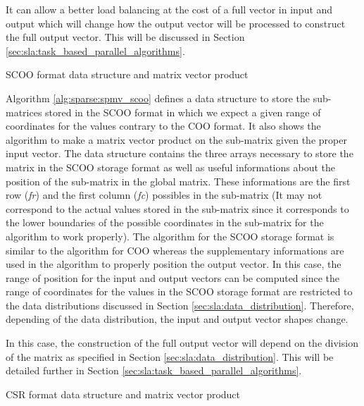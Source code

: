 It can allow a better load balancing at the cost of a full vector in input and output which will change how the output vector will be processed to construct the full output vector.
This will be discussed in Section \ref{sec:sla:task_based_parallel_algorithms}.


\begin{algorithm}[h]
	\DontPrintSemicolon
	\SetAlgoVlined
	\caption{SCOO format data structure and matrix vector product\label{alg:sparse:spmv_scoo}}

	\;
\end{algorithm}

Algorithm \ref{alg:sparse:spmv_scoo} defines a data structure to store the sub-matrices stored in the SCOO format in which we expect a given range of coordinates for the values contrary to the COO format.
It also shows the algorithm to make a matrix vector product on the sub-matrix given the proper input vector.
The data structure contains the three arrays necessary to store the matrix in the SCOO storage format as well as useful informations about the position of the sub-matrix in the global matrix.
These informations are the first row (\textit{fr}) and the first column (\textit{fc}) possibles in the sub-matrix (It may not correspond to the actual values stored in the sub-matrix since it corresponds to the lower boundaries of the possible coordinates in the sub-matrix for the algorithm to work properly).
The algorithm for the SCOO storage format is similar to the algorithm for COO whereas the supplementary informations are used in the algorithm to properly position the output vector.
In this case, the range of position for the input and output vectors can be computed since the range of coordinates for the values in the SCOO storage format are restricted to the data distributions discussed in Section \ref{sec:sla:data_distribution}.
Therefore, depending of the data distribution, the input and output vector shapes change.

In this case, the construction of the full output vector will depend on the division of the matrix as specified in Section \ref{sec:sla:data_distribution}.
This will be detailed further in Section \ref{sec:sla:task_based_parallel_algorithms}.


\begin{algorithm}[h]
	\DontPrintSemicolon
	\SetAlgoVlined
	\caption{CSR format data structure and matrix vector product\label{alg:sparse:spmv_csr}}

	\;
\end{algorithm}

